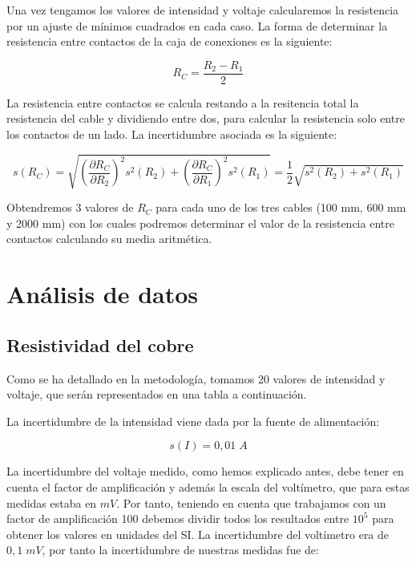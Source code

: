 \documentclass[a4paper,12pt,titlepage]{article}
\begin{document}
\par Una vez tengamos los valores de intensidad y voltaje calcularemos la resistencia por un ajuste de mínimos cuadrados en cada caso. La forma de determinar la resistencia entre contactos de la caja de conexiones es la siguiente:

\begin{equation}
    R_{C} = \frac{R_{2}-R_{1}}{2}
    \label{Resistencia contactos}
\end{equation}

La resistencia entre contactos se calcula restando a la resitencia total la resistencia del cable y dividiendo entre dos, para calcular la resistencia solo entre los contactos de un lado. La incertidumbre asociada es la siguiente:

\begin{equation}
    s(R_{C}) = \sqrt{\left (\frac{\partial R_{C}}{\partial R_{2}}\right )^2s^2(R_{2})  +  \left (\frac{\partial R_{C}}{\partial R_{1}}\right )^2s^2(R_{1})} = \frac{1}{2}\sqrt{s^2(R_{2})  +  s^2(R_{1})}
    \label{Inc Resistencia caja}
\end{equation}

Obtendremos 3 valores de $R_{C}$ para cada uno de los tres cables (100 mm, 600 mm y 2000 mm) con los cuales podremos determinar el valor de la resistencia entre contactos calculando su media aritmética.

\newpage

\section{Análisis de datos}

\subsection{Resistividad del cobre}

Como se ha detallado en la metodología, tomamos 20 valores de intensidad y voltaje, que serán representados en una tabla a continuación.

\par La incertidumbre de la intensidad viene dada por la fuente de alimentación:

\begin{equation}
    s(I) = 0,01 \; A
\end{equation}

La incertidumbre del voltaje medido, como hemos explicado antes, debe tener en cuenta el factor de amplificación y además la escala del voltímetro, que para estas medidas estaba en $mV$. Por tanto, teniendo en cuenta que trabajamos con un factor de amplificación 100 debemos dividir todos los resultados entre $10^5$ para obtener los valores en unidades del SI. La incertidumbre del voltímetro era de $0,1 \; mV$, por tanto la incertidumbre de nuestras medidas fue de:
\end{document}
